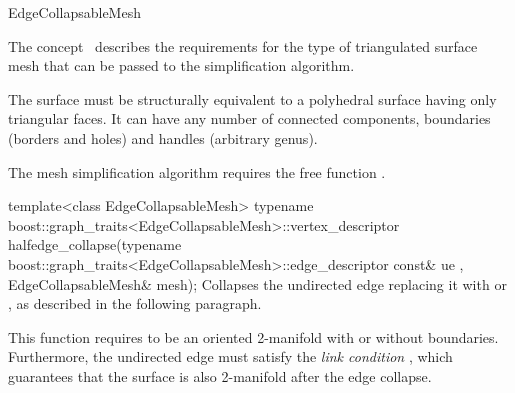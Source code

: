 
\begin{ccRefConcept}{EdgeCollapsableMesh}


\ccDefinition

The concept \ccRefName\ describes the requirements for the type of 
triangulated surface mesh that can be passed to the
simplification algorithm.

The surface must be structurally equivalent to a polyhedral surface
having only triangular faces. 
It can have any number of connected components, boundaries 
(borders and holes) and handles (arbitrary genus).

\ccRefines
{}


The mesh simplification algorithm requires the free function .

  \ccTagFullDeclarations
  \def\ccLongParamLayout{\ccTrue}
  \ccFunction
  {template<class EdgeCollapsableMesh>
  typename boost::graph_traits<EdgeCollapsableMesh>::vertex_descriptor
  halfedge_collapse(typename boost::graph_traits<EdgeCollapsableMesh>::edge_descriptor const& ue
                   , EdgeCollapsableMesh& mesh);
  }  
  {Collapses the undirected edge  replacing it with  or ,
  as described in the following paragraph.}

    

\ccPrecond This function requires  to be an oriented 2-manifold with or without boundaries. Furthermore, the undirected edge  must satisfy the {\em link condition} 
\cite{degn-tpec-98}, which guarantees that the surface is also 2-manifold after the edge collapse. 


\end{ccRefConcept}
